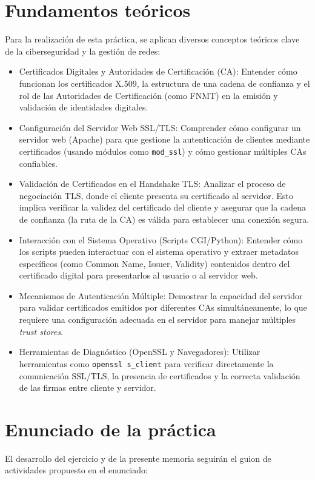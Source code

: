 \section{Fundamentos teóricos}
Para la realización de esta práctica, se aplican diversos conceptos teóricos clave de la ciberseguridad y la gestión de redes:
\begin{itemize}
    \item Certificados Digitales y Autoridades de Certificación (CA): Entender cómo funcionan los certificados X.509, la estructura de una cadena de confianza y el rol de las Autoridades de Certificación (como FNMT) en la emisión y validación de identidades digitales.
    \item Configuración del Servidor Web SSL/TLS: Comprender cómo configurar un servidor web (Apache) para que gestione la autenticación de clientes mediante certificados (usando módulos como \texttt{mod\_ssl}) y cómo gestionar múltiples CAs confiables.
    \item Validación de Certificados en el Handshake TLS: Analizar el proceso de negociación TLS, donde el cliente presenta su certificado al servidor. Esto implica verificar la validez del certificado del cliente y asegurar que la cadena de confianza (la ruta de la CA) es válida para establecer una conexión segura.
    \item Interacción con el Sistema Operativo (Scripts CGI/Python): Entender cómo los scripts pueden interactuar con el sistema operativo y extraer metadatos específicos (como Common Name, Issuer, Validity) contenidos dentro del certificado digital para presentarlos al usuario o al servidor web.
    \item Mecanismos de Autenticación Múltiple: Demostrar la capacidad del servidor para validar certificados emitidos por diferentes CAs simultáneamente, lo que requiere una configuración adecuada en el servidor para manejar múltiples \textit{trust stores}.
    \item Herramientas de Diagnóstico (OpenSSL y Navegadores): Utilizar herramientas como \texttt{openssl s\_client} para verificar directamente la comunicación SSL/TLS, la presencia de certificados y la correcta validación de las firmas entre cliente y servidor.
\end{itemize}

\section{Enunciado de la práctica}
El desarrollo del ejercicio y de la presente memoria seguirán el guion de actividades propuesto en el enunciado:

